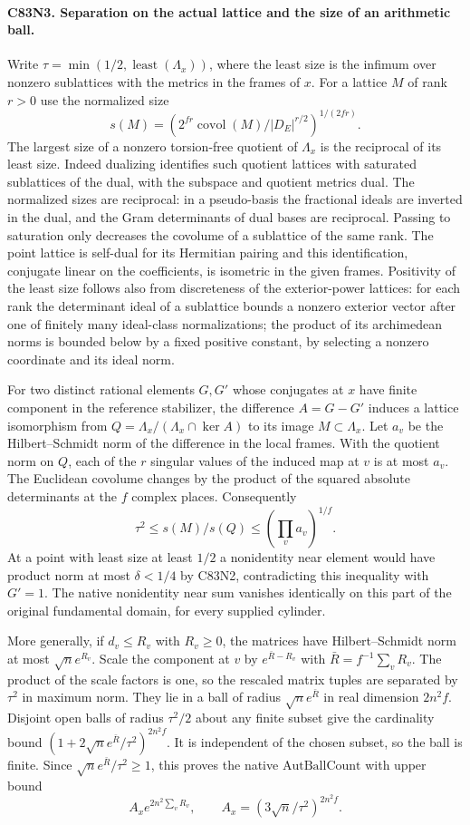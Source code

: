 \paragraph{C83N3. Separation on the actual lattice and the size of an arithmetic ball.}
Write $\tau=\min(1/2,\operatorname{least}(\Lambda_x))$,
where the least size is the infimum over nonzero sublattices
with the metrics in the frames of $x$. For a lattice $M$ of
rank $r>0$ use the normalized size
\[
   s(M)=\left(2^{fr}\operatorname{covol}(M)/
                |D_E|^{r/2}\right)^{1/(2fr)} .
\]
The largest size of a nonzero torsion-free quotient of
$\Lambda_x$ is the reciprocal of its least size. Indeed
dualizing identifies such quotient lattices with saturated
sublattices of the dual, with the subspace and quotient
metrics dual. The normalized sizes are reciprocal: in a
pseudo-basis the fractional ideals are inverted in the
dual, and the Gram determinants of dual bases are reciprocal.
Passing to saturation only decreases the covolume of a
sublattice of the same rank. The point lattice is self-dual
for its Hermitian pairing and this identification, conjugate
linear on the coefficients, is isometric in the given frames.
Positivity of the least size follows also from discreteness of
the exterior-power lattices: for each rank the determinant
ideal of a sublattice bounds a nonzero exterior vector after
one of finitely many ideal-class normalizations; the product
of its archimedean norms is bounded below by a fixed positive
constant, by selecting a nonzero coordinate and its ideal norm.

For two distinct rational elements $G,G'$ whose conjugates
at $x$ have finite component in the reference stabilizer,
the difference $A=G-G'$ induces a lattice isomorphism from
$Q=\Lambda_x/(\Lambda_x\cap\ker A)$ to its image $M\subset\Lambda_x$.
Let $a_v$ be the Hilbert--Schmidt norm of the difference in
the local frames. With the quotient norm on $Q$, each of the
$r$ singular values of the induced map at $v$ is at most $a_v$.
The Euclidean covolume changes by the product of the squared
absolute determinants at the $f$ complex places. Consequently
\[
       \tau^2\le s(M)/s(Q)\le(\prod_v a_v)^{1/f}.
\]
At a point with least size at least $1/2$ a nonidentity near
element would have product norm at most $\delta<1/4$ by C83N2,
contradicting this inequality with $G'=1$. The native
nonidentity near sum vanishes identically on this part of the
original fundamental domain, for every supplied cylinder.

More generally, if $d_v\le R_v$ with $R_v\ge0$, the matrices
have Hilbert--Schmidt norm at most $\sqrt n e^{R_v}$. Scale
the component at $v$ by $e^{\bar R-R_v}$ with
$\bar R=f^{-1}\sum_v R_v$. The product of the scale factors
is one, so the rescaled matrix tuples are separated by
$\tau^2$ in maximum norm. They lie in a ball of radius
$\sqrt n e^{\bar R}$ in real dimension $2n^2f$. Disjoint
open balls of radius $\tau^2/2$ about any finite subset give
the cardinality bound $(1+2\sqrt n e^{\bar R}/\tau^2)^{2n^2f}$.
It is independent of the chosen subset, so the ball is finite.
Since $\sqrt n e^{\bar R}/\tau^2\ge1$, this proves the native
$\mathrm{AutBallCount}$ with upper bound
\[
          A_x e^{2n^2\sum_v R_v},\qquad
          A_x=(3\sqrt n/\tau^2)^{2n^2 f}.
\]

